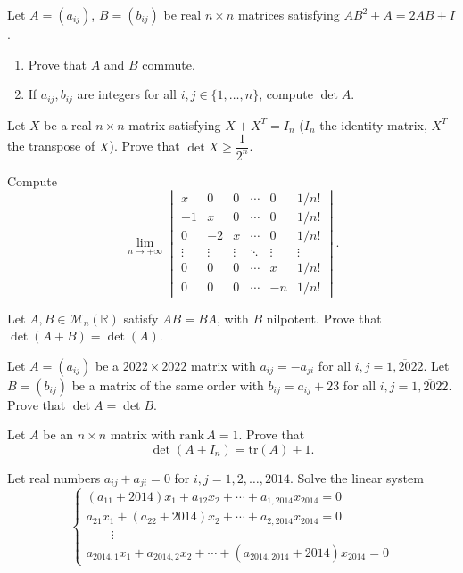 \documentclass[12pt]{article}
\begin{document}
\begin{problem}
Let $A=(a_{ij})$, $B=(b_{ij})$ be real $n\times n$ matrices satisfying $AB^2+A = 2AB+I$.
\begin{enumerate}[label=\alph*)]
\item Prove that $A$ and $B$ commute.
\item If $a_{ij},b_{ij}$ are integers for all $i,j\in\{1,\dots,n\}$, compute $\det A$.
\end{enumerate}
\end{problem}

\begin{problem}
Let $X$ be a real $n\times n$ matrix satisfying $X+X^T=I_n$ ($I_n$ the identity matrix, $X^T$ the transpose of $X$). Prove that $\det X \geq \dfrac{1}{2^n}$.
\end{problem}

\begin{problem}
Compute
\[
\lim_{n\to+\infty}
\begin{vmatrix}
x & 0 & 0 & \cdots & 0 & 1/n!\\
-1 & x & 0 & \cdots & 0 & 1/n!\\
0 & -2 & x & \cdots & 0 & 1/n!\\
\vdots & \vdots & \vdots & \ddots & \vdots & \vdots\\
0 & 0 & 0 & \cdots & x & 1/n!\\
0 & 0 & 0 & \cdots & -n & 1/n!
\end{vmatrix}.
\]
\end{problem}

\begin{problem}
Let $A,B\in\mathcal{M}_n(\mathbb{R})$ satisfy $AB=BA$, with $B$ nilpotent. Prove that $\det(A+B)=\det(A)$.
\end{problem}

\begin{problem}
Let $A=(a_{ij})$ be a $2022\times2022$ matrix with $a_{ij}=-a_{ji}$ for all $i,j=\overline{1,2022}$. Let $B=(b_{ij})$ be a matrix of the same order with $b_{ij}=a_{ij}+23$ for all $i,j=\overline{1,2022}$. Prove that $\det A = \det B$.
\end{problem}

\begin{problem}
Let $A$ be an $n\times n$ matrix with $\mathrm{rank}\,A=1$. Prove that
\[ \det(A+I_n) = \mathrm{tr}(A)+1. \]
\end{problem}

\begin{problem}
Let real numbers $a_{ij}+a_{ji}=0$ for $i,j=1,2,\dots,2014$. Solve the linear system
\[
\begin{cases}
(a_{11}+2014)x_1 + a_{12}x_2 + \cdots + a_{1,2014}x_{2014} = 0\\
a_{21}x_1 + (a_{22}+2014)x_2 + \cdots + a_{2,2014}x_{2014} = 0\\
\qquad\vdots\\
a_{2014,1}x_1 + a_{2014,2}x_2 + \cdots + (a_{2014,2014}+2014)x_{2014} = 0
\end{cases}
\]
\end{problem}
\end{document}
